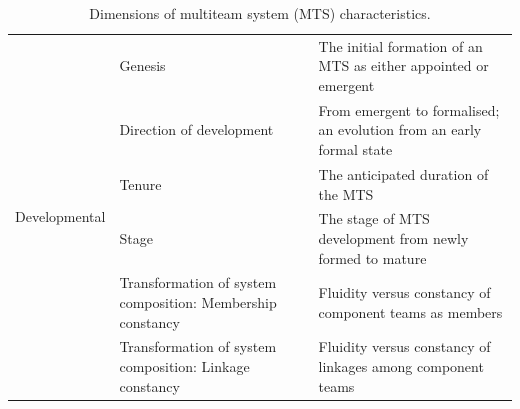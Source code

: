 \begin{table}[H]
\begin{adjustwidth}{-1.15cm}{}
\begin{tabular}{ | p{2.7cm} | p{5cm} | p{9cm} | }
\hline
	\multirow{6}{*}{Developmental} & Genesis & The initial formation of an MTS as either appointed or emergent \\ \cline{2-3}
 	& Direction of development & From emergent to formalised; an evolution from an early formal state \\ \cline{2-3}
	& Tenure & The anticipated duration of the MTS \\ \cline{2-3}
	& Stage & The stage of MTS development from newly formed to mature \\ \cline{2-3}
	& Transformation of system composition: Membership constancy & Fluidity versus constancy of component teams as members \\ \cline{2-3}
	& Transformation of system composition: Linkage constancy & Fluidity versus constancy of linkages among component teams \\ \cline{2-3}
	\hline
\end{tabular}
\caption{Dimensions of multiteam system (MTS) characteristics.}
\label{domsc}
\end{adjustwidth}
\end{table}